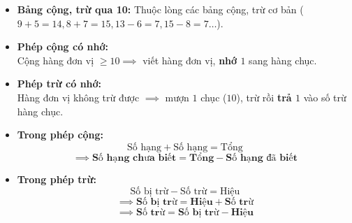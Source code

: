 \documentclass[10pt,a4paper]{article}
\begin{document}
\noindent
\begin{minipage}[t]{0.49\textwidth}\vspace{0pt}
\begin{tcolorbox}[
  enhanced,
  colback=violet!4!white,
  colframe=violet!75!black,
  arc=2mm, boxrule=0.8pt,
  left=2mm, right=2mm, top=1.8mm, bottom=1.8mm,
  title={\footnotesize\bfseries\color{white}\faKey\ 1. Kĩ thuật cộng, trừ có nhớ trong phạm vi 100}
]
{\footnotesize
\begin{itemize}\setlength{\itemsep}{1pt}\setlength{\leftskip}{-2.5mm}
  \item \textbf{Bảng cộng, trừ qua 10:} Thuộc lòng các bảng cộng, trừ cơ bản ($9+5=14, 8+7=15, 13-6=7, 15-8=7\dots$).
  \item \textbf{Phép cộng có nhớ:}\\
  Cộng hàng đơn vị $\ge 10 \implies$ viết hàng đơn vị, \textbf{nhớ $1$} sang hàng chục.
  \item \textbf{Phép trừ có nhớ:}\\
  Hàng đơn vị không trừ được $\implies$ mượn $1$ chục ($10$), trừ rồi \textbf{trả $1$} vào số trừ hàng chục.
\end{itemize}
}
\end{tcolorbox}
\end{minipage}
\hfill
\begin{minipage}[t]{0.49\textwidth}\vspace{0pt}
\begin{tcolorbox}[
  enhanced,
  colback=teal!4!white,
  colframe=teal!75!black,
  arc=2mm, boxrule=0.8pt,
  left=2mm, right=2mm, top=1.8mm, bottom=1.8mm,
  title={\footnotesize\bfseries\color{white}\faSliders\ 2. Mối quan hệ giữa các thành phần phép tính}
]
{\footnotesize
\begin{itemize}\setlength{\itemsep}{1pt}\setlength{\leftskip}{-2.5mm}
  \item \textbf{Trong phép cộng:}
  $$\text{Số hạng} + \text{Số hạng} = \text{Tổng}$$
  $$\implies \mathbf{\text{Số hạng chưa biết} = \text{Tổng} - \text{Số hạng đã biết}}$$
  \item \textbf{Trong phép trừ:}
  $$\text{Số bị trừ} - \text{Số trừ} = \text{Hiệu}$$
  $$\implies \mathbf{\text{Số bị trừ} = \text{Hiệu} + \text{Số trừ}}$$
  $$\implies \mathbf{\text{Số trừ} = \text{Số bị trừ} - \text{Hiệu}}$$
\end{itemize}
}
\end{tcolorbox}
\end{minipage}
\end{document}
